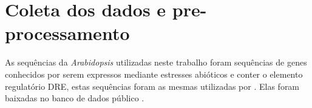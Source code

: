 \section{Coleta dos dados e pre-processamento}\label{cap1}

As sequências da \textit{Arabidopsis} utilizadas neste trabalho foram sequências de genes conhecidos por serem expressos mediante estresses abióticos e conter o elemento regulatório DRE, estas sequências foram as mesmas utilizadas por \cite{Wang2009}. Elas foram baixadas no banco de dados público \cite{Thomas-Chollier2008}.